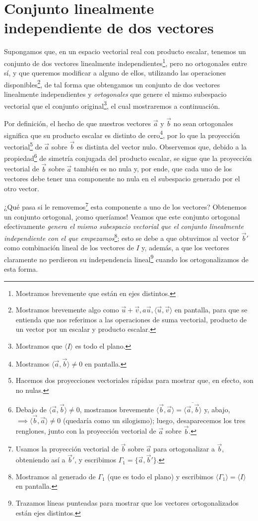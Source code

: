 \documentclass[12pt,dvipsnames]{article}
\numberwithin{equation}{section}
\begin{document}

\newpage
\section{Conjunto linealmente independiente de dos vectores}

Supongamos que, en un espacio vectorial real con producto escalar, tenemos un conjunto de dos vectores linealmente independientes\footnote{Mostramos brevemente que están en ejes distintos.}, pero no ortogonales entre sí, y que queremos modificar a alguno de ellos, utilizando las operaciones disponibles\footnote{Mostramos brevemente algo como $\vec{u}+\vec{v}, a\vec{u}, \langle\vec{u},\vec{v}\rangle$ en pantalla, para que se entienda que nos referimos a las operaciones de suma vectorial, producto de un vector por un escalar y producto escalar.}, de tal forma que obtengamos un conjunto de dos vectores linealmente independientes y \emph{ortogonales} que genere el mismo subespacio vectorial que el conjunto original\footnote{Mostramos que $\langle I\rangle$ es todo el plano.}, el cual mostraremos a continuación.

Por definición, el hecho de que nuestros vectores $\vec{a}$ y $\vec{b}$ no sean ortogonales significa que su producto escalar es distinto de cero\footnote{Mostramos $\langle \vec{a},\vec{b}\rangle\neq0$ en pantalla.}, por lo que la proyección vectorial\footnote{Hacemos dos proyecciones vectoriales rápidas para mostrar que, en efecto, son no nulas.} de $\vec{a}$ sobre $\vec{b}$ es distinta del vector nulo. Observemos que, debido a la propiedad\footnote{Debajo de $\langle\vec{a},\vec{b}\rangle\neq0$, mostramos brevemente $\langle \vec{b},\vec{a}\rangle = \overline{\langle \vec{a},\vec{b}\rangle}$ y, abajo, $\implies \langle\vec{b},\vec{a}\rangle\neq0$ (quedaría como un silogismo); luego, desaparecemos los tres renglones, junto con la proyección vectorial de $\vec{a}$ sobre $\vec{b}$.} de simetría conjugada del producto escalar, se sigue que la proyección vectorial de $\vec{b}$ sobre $\vec{a}$ también es no nula y, por ende, que cada uno de los vectores debe tener una componente no nula en el subespacio generado por el otro vector.

¿Qué pasa si le removemos\footnote{Usamos la proyección vectorial de $\vec{b}$ sobre $\vec{a}$ para ortogonalizar a $\vec{b}$, obteniendo así a $\vec{b}'$, y escribimos $\Gamma_1=\{\vec{a},\vec{b}'\}$.} esta componente a uno de los vectores? Obtenemos un conjunto ortogonal, ¡como queríamos! Veamos que este conjunto ortogonal efectivamente \emph{genera el mismo subespacio vectorial que el conjunto linealmente independiente con el que empezamos}\footnote{Mostramos al generado de $\Gamma_1$ (que es todo el plano) y escribimos $\langle \Gamma_1 \rangle = \langle I \rangle$ en pantalla.}; esto se debe a que obtuvimos al vector $\vec{b}'$ como combinación lineal de los vectores de $I$ y, además, a que los vectores claramente no perdieron su independencia lineal\footnote{Trazamos líneas punteadas para mostrar que los vectores ortogonalizados están ejes distintos.} cuando los ortogonalizamos de esta forma.
\end{document}
